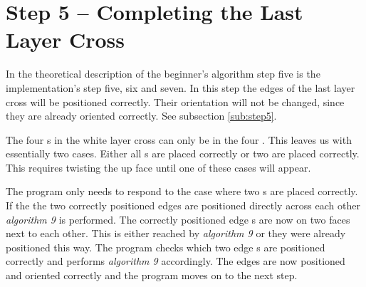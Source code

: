 \section{Step 5 -- Completing the Last Layer Cross}
In the theoretical description of the beginner's algorithm step five is the implementation's step five, six and seven. 
In this step the edges of the last layer cross will be positioned correctly. Their orientation will not be changed, since they are already oriented correctly. See subsection \ref{sub:step5}.

The four \cpiece{}s in the white layer cross can only be in the four \cubicle{}. This leaves us with essentially two cases. Either all \cpiece{}s are placed correctly or two are placed correctly. This requires twisting the up face until one of these cases will appear.

The program only needs to respond to the case where two \cpiece{}s are placed correctly. 
If the the two correctly positioned edges are positioned directly across each other \textit{algorithm 9} is performed.
The correctly positioned edge \cpiece{}s are now on two faces next to each other. This is either reached by \textit{algorithm 9} or they were already positioned this way.
The program checks which two edge \cpiece{}s are positioned correctly and performs \textit{algorithm 9} accordingly. 
The edges are now positioned and oriented correctly and the program moves on to the next step.